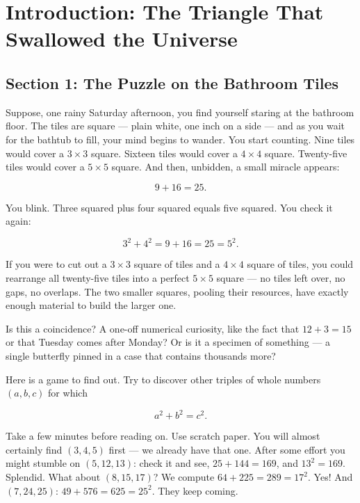 \documentclass[11pt,twoside,openright]{book}
\theoremstyle{definition}
\theoremstyle{remark}
\begin{document}
\chapter*{Introduction: The Triangle That Swallowed the Universe}


\section{Section 1: The Puzzle on the Bathroom Tiles}

Suppose, one rainy Saturday afternoon, you find yourself staring at the bathroom floor. The tiles are square --- plain white, one inch on a side --- and as you wait for the bathtub to fill, your mind begins to wander. You start counting. Nine tiles would cover a $3 \times 3$ square. Sixteen tiles would cover a $4 \times 4$ square. Twenty-five tiles would cover a $5 \times 5$ square. And then, unbidden, a small miracle appears:

\[9 + 16 = 25.\]

You blink. Three squared plus four squared equals five squared. You check it again:

\[3^2 + 4^2 = 9 + 16 = 25 = 5^2.\]

If you were to cut out a $3 \times 3$ square of tiles and a $4 \times 4$ square of tiles, you could rearrange all twenty-five tiles into a perfect $5 \times 5$ square --- no tiles left over, no gaps, no overlaps. The two smaller squares, pooling their resources, have exactly enough material to build the larger one.

Is this a coincidence? A one-off numerical curiosity, like the fact that $12 + 3 = 15$ or that Tuesday comes after Monday? Or is it a specimen of something --- a single butterfly pinned in a case that contains thousands more?

Here is a game to find out. Try to discover other triples of whole numbers $(a, b, c)$ for which

\[a^2 + b^2 = c^2.\]

Take a few minutes before reading on. Use scratch paper. You will almost certainly find $(3, 4, 5)$ first --- we already have that one. After some effort you might stumble on $(5, 12, 13)$: check it and see, $25 + 144 = 169$, and $13^2 = 169$. Splendid. What about $(8, 15, 17)$? We compute $64 + 225 = 289 = 17^2$. Yes! And $(7, 24, 25)$: $49 + 576 = 625 = 25^2$. They keep coming.
\end{document}
